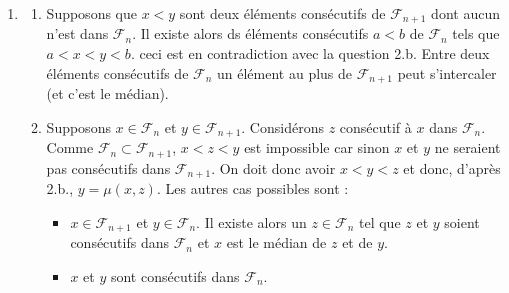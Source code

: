 \begin{enumerate}
\begin{enumerate}
Le m{\'e}dian $\frac{p+p^{\prime }}{q+q^{\prime }}$ et le nombre $\frac{p^{\prime \prime }}{q^{\prime \prime }}=\frac{p^{\prime \prime }}{q+q^{\prime }}$ sont dans $\left] \frac{p}{q},\frac{p^{\prime }}{q^{\prime }}\right[ $. Si par exemple
\[
\frac{p}{q}<\frac{p^{\prime \prime }}{q+q^{\prime }}\leq \frac{p+p^{\prime }%
}{q+q^{\prime }}
\]
alors
\begin{eqnarray*}
\frac{p+p^{\prime }}{q+q^{\prime }}-\frac{p^{\prime \prime }}{q+q^{\prime }}
&\leq &\frac{p+p^{\prime }}{q+q^{\prime }}-\frac{p}{q} \\
\frac{p+p^{\prime }-p^{\prime \prime }}{q+q^{\prime }} &\leq &\frac{%
p^{\prime }q-pq^{\prime }}{(q+q^{\prime })q}=\frac{1}{(q+q^{\prime })q} \\
q(p+p^{\prime }-p^{\prime \prime }) &\leq &1
\end{eqnarray*}

La seule possibilit{\'e} est $p^{\prime \prime }=p+p^{\prime }$. Un calcul
analogue dans le cas o{\`u} $\frac{p^{\prime \prime }}{q^{\prime \prime }}$
est de l'autre c{\^o}t{\'e} du m{\'e}dian ach{\`e}ve de montrer que ce
m{\'e}dian est le seul {\'e}l{\'e}ment possible de $\mathcal{F}_{n+1}$ entre
$\frac{p}{q}$ et $\frac{p^{\prime }}{q^{\prime }}$.
\end{enumerate}

\item \begin{enumerate}
 \item Supposons que $x<y$ sont deux éléments consécutifs de $\mathcal F_{n+1}$ dont aucun n'est dans $\mathcal F_n$. Il existe alors ds éléments consécutifs $a<b$ de $\mathcal F_n$ tels que $a<x<y<b$. ceci est en contradiction avec la question 2.b. Entre deux éléments consécutifs de $\mathcal F_n$ un élément au plus de $\mathcal F_{n+1}$ peut s'intercaler (et c'est le médian).
\item Supposons $x\in \mathcal F_n$ et $y\in \mathcal F_{n+1}$. Considérons $z$ consécutif à $x$ dans $\mathcal F_n$. Comme $\mathcal F_n \subset \mathcal F_{n+1}$, $x<z<y$ est impossible car sinon $x$ et $y$ ne seraient pas consécutifs dans $\mathcal F_{n+1}$. On doit donc avoir $x<y<z$ et donc, d'après 2.b., $y=\mu (x,z)$.\newline
Les autres cas possibles sont :
\begin{itemize}
 \item $x\in \mathcal F_{n+1}$ et $y\in \mathcal F_n$. Il existe alors un $z\in \mathcal F_n$ tel que $z$ et $y$ soient consécutifs dans $\mathcal F_n$ et $x$ est le médian de $z$ et de $y$.
 \item $x$ et $y$ sont consécutifs dans $\mathcal F_n$. 
\end{itemize}
\end{enumerate}



\end{enumerate}
